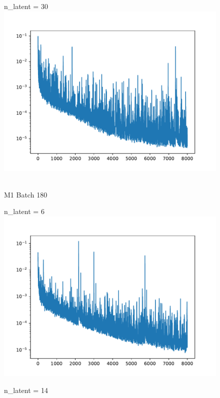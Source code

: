 \documentclass[USenglish]{article}
\newcommand{\1}{\begin{pmatrix}
		1\\
		1
\end{pmatrix}}
\begin{document}
\begin{figure}
\begin{minipage}{0.32\textwidth}
	\centering
	n\_latent = 30\\
	\includegraphics[width=\textwidth, trim={20 0 45 30}, clip]{loss_convAE_trial_001_batch_016_n_dense_030.pdf}
\end{minipage}\\
M1 Batch 180\\[0.5em]
\begin{minipage}{0.32\textwidth}
\centering
n\_latent = 6\\
\includegraphics[width=\textwidth, trim={20 0 45 30}, clip]{loss_convAE_trial_001_batch_180_n_dense_006.pdf}
\end{minipage}
\begin{minipage}{0.32\textwidth}
\centering
n\_latent = 14\\

\end{minipage}
\end{figure}
\end{document}
